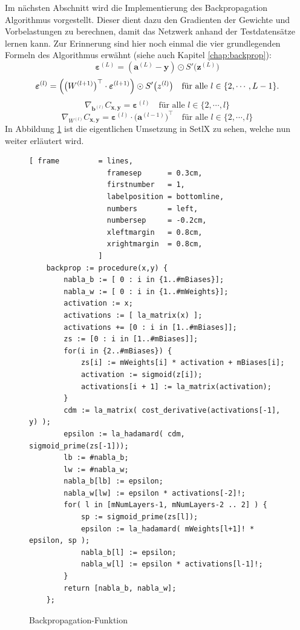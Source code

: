 \noindent
Im nächsten Abschnitt wird die Implementierung des Backpropagation Algorithmus vorgestellt. Dieser dient dazu den Gradienten der Gewichte und Vorbelastungen zu berechnen, damit das Netzwerk anhand der Testdatensätze lernen kann. Zur Erinnerung sind hier noch einmal die vier grundlegenden Formeln des Algorithmus erwähnt (siehe auch Kapitel \ref{chap:backprop}):
\begin{equation} \label{eq:BP1_impl}
	\boldsymbol{\varepsilon}^{(L)} = (\mathbf{a}^{(L)} - \mathbf{y}) \odot S'\bigl(\mathbf{z}^{(L)}\bigr)  
\end{equation}
\begin{equation} \label{eq:BP2_impl}
	\boldsymbol{\varepsilon}^{(l)} = \Bigl(\bigl(W^{(l+1)}\bigr)^\top \cdot \boldsymbol{\varepsilon}^{(l+1)}\Bigr) \odot
  S'\bigl(z^{(l)}\bigr) \quad \mbox{für alle $l \in \{2, \cdots, L-1\}$}.
\end{equation}
\begin{equation} \label{eq:BP3_impl}
	\nabla_{\mathbf{b}^{(l)}} C_{\mathbf{x}, \mathbf{y}} = \boldsymbol{\varepsilon}^{(l)}
  \quad \mbox{für alle $l \in \{2, \cdots,l\}$}
\end{equation}
\begin{equation} \label{eq:BP4_impl}
	\nabla_{W^{(l)}} C_{\mathbf{x}, \mathbf{y}} = \boldsymbol{\varepsilon}^{(l)} \cdot \bigl(\mathbf{a}^{(l-1)}\bigr)^\top
  \quad \mbox{für alle $l \in \{2, \cdots,l\}$}
\end{equation}
In Abbildung \ref{fig:backprop_func} ist die eigentlichen Umsetzung in SetlX zu sehen, welche nun weiter erläutert wird.
\begin{figure}
\begin{Verbatim}[ frame         = lines, 
                  framesep      = 0.3cm, 
                  firstnumber   = 1,
                  labelposition = bottomline,
                  numbers       = left,
                  numbersep     = -0.2cm,
                  xleftmargin   = 0.8cm,
                  xrightmargin  = 0.8cm,
                ]
    backprop := procedure(x,y) {
        nabla_b := [ 0 : i in {1..#mBiases}];
        nabla_w := [ 0 : i in {1..#mWeights}];
        activation := x;
        activations := [ la_matrix(x) ];
        activations += [0 : i in [1..#mBiases]];
        zs := [0 : i in [1..#mBiases]];		
        for(i in {2..#mBiases}) {
            zs[i] := mWeights[i] * activation + mBiases[i];	
            activation := sigmoid(z[i]);
            activations[i + 1] := la_matrix(activation);
        }
        cdm := la_matrix( cost_derivative(activations[-1], y) );
        epsilon := la_hadamard( cdm, sigmoid_prime(zs[-1]));
        lb := #nabla_b;
        lw := #nabla_w;
        nabla_b[lb] := epsilon;	
        nabla_w[lw] := epsilon * activations[-2]!;				
        for( l in [mNumLayers-1, mNumLayers-2 .. 2] ) {
            sp := sigmoid_prime(zs[l]);
            epsilon := la_hadamard( mWeights[l+1]! * epsilon, sp );
            nabla_b[l] := epsilon;
            nabla_w[l] := epsilon * activations[l-1]!;
        }
        return [nabla_b, nabla_w];
    };
\end{Verbatim}
\vspace*{-0.3cm}
\caption{Backpropagation-Funktion}
\label{fig:backprop_func}
\end{figure}
